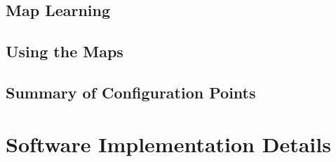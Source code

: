 
\subsection{Map Learning}




\subsection{Using the Maps}




\subsection{Summary of Configuration Points}

\section{Software Implementation Details}


